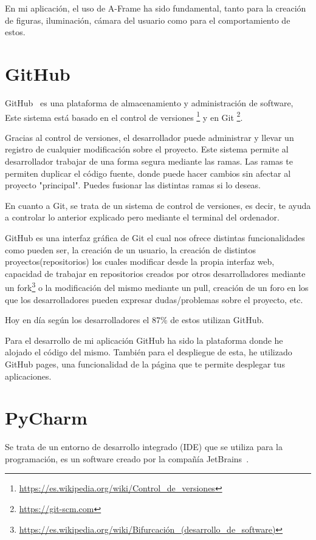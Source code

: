 \documentclass[a4paper, 12pt]{book}
\begin{document}
En mi aplicación, el uso de A-Frame ha sido fundamental, tanto para la creación de figuras, iluminación, cámara del usuario como para el comportamiento de estos.

\section{GitHub} %
\label{sec:GitHub}
GitHub~\cite{GITHUB} es una plataforma de almacenamiento y administración  de software, Este sistema está basado en el control de versiones \footnote{\url{https://es.wikipedia.org/wiki/Control_de_versiones}} y en Git \footnote{\url{https://git-scm.com}}.

Gracias al control de versiones, el desarrollador puede administrar y llevar un registro de cualquier modificación sobre el proyecto. Este sistema permite al desarrollador trabajar de una forma segura mediante las ramas. Las ramas te permiten duplicar el código fuente, donde puede hacer cambios sin afectar al proyecto "principal". Puedes fusionar las distintas ramas si lo deseas.

En cuanto a Git, se trata de un sistema de control de versiones, es decir, te ayuda a controlar lo anterior explicado pero mediante el terminal del ordenador.

GitHub es una interfaz gráfica de Git el cual nos ofrece distintas funcionalidades como pueden ser, la creación de un usuario, la creación de distintos proyectos(repositorios) los cuales modificar desde la propia interfaz web, capacidad de trabajar en repositorios creados por otros desarrolladores mediante un fork\footnote{\url{https://es.wikipedia.org/wiki/Bifurcación_(desarrollo_de_software)}} o la modificación del mismo mediante un pull, creación de un foro en los que los desarrolladores pueden expresar dudas/problemas sobre el proyecto, etc.

Hoy en día según los desarrolladores  el 87\% de estos utilizan GitHub.

Para el desarrollo de mi aplicación GitHub ha sido la plataforma donde he alojado el código del mismo. También para el despliegue de esta, he utilizado GitHub pages, una funcionalidad de la página que te permite desplegar tus aplicaciones.

\section{PyCharm} %
\label{sec:GitHub}
Se trata de un entorno de desarrollo integrado (IDE) que se utiliza para la programación, es un software creado por la compañía JetBrains~\cite{jetbrains}.
\end{document}
